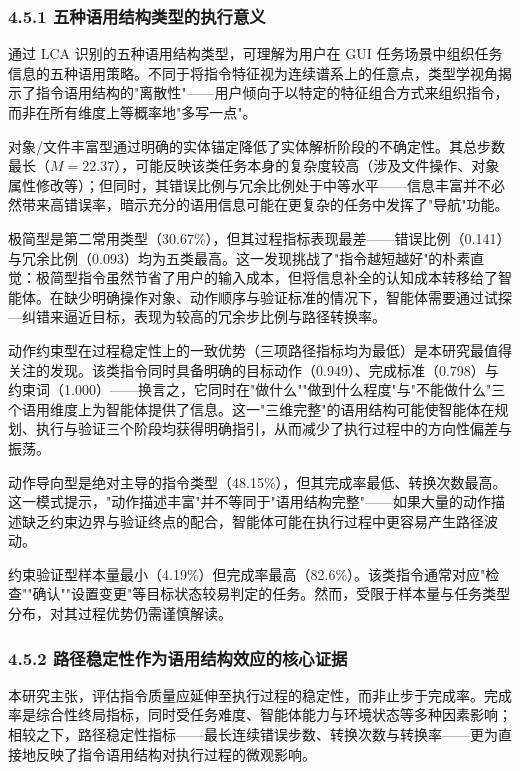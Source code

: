 \documentclass[12pt,a4paper,openany,oneside]{ctexrep}
\begin{document}
\subsubsection{4.5.1 五种语用结构类型的执行意义}


通过 LCA 识别的五种语用结构类型，可理解为用户在 GUI 任务场景中组织任务信息的五种语用策略。不同于将指令特征视为连续谱系上的任意点，类型学视角揭示了指令语用结构的"离散性"——用户倾向于以特定的特征组合方式来组织指令，而非在所有维度上等概率地"多写一点"。

对象/文件丰富型通过明确的实体锚定降低了实体解析阶段的不确定性。其总步数最长（$M=22.37$），可能反映该类任务本身的复杂度较高（涉及文件操作、对象属性修改等）；但同时，其错误比例与冗余比例处于中等水平——信息丰富并不必然带来高错误率，暗示充分的语用信息可能在更复杂的任务中发挥了"导航"功能。

极简型是第二常用类型（30.67\%），但其过程指标表现最差——错误比例（0.141）与冗余比例（0.093）均为五类最高。这一发现挑战了"指令越短越好"的朴素直觉：极简型指令虽然节省了用户的输入成本，但将信息补全的认知成本转移给了智能体。在缺少明确操作对象、动作顺序与验证标准的情况下，智能体需要通过试探—纠错来逼近目标，表现为较高的冗余步比例与路径转换率。

动作约束型在过程稳定性上的一致优势（三项路径指标均为最低）是本研究最值得关注的发现。该类指令同时具备明确的目标动作（0.949）、完成标准（0.798）与约束词（1.000）——换言之，它同时在"做什么""做到什么程度"与"不能做什么"三个语用维度上为智能体提供了信息。这一"三维完整"的语用结构可能使智能体在规划、执行与验证三个阶段均获得明确指引，从而减少了执行过程中的方向性偏差与振荡。

动作导向型是绝对主导的指令类型（48.15\%），但其完成率最低、转换次数最高。这一模式提示，"动作描述丰富"并不等同于"语用结构完整"——如果大量的动作描述缺乏约束边界与验证终点的配合，智能体可能在执行过程中更容易产生路径波动。

约束验证型样本量最小（4.19\%）但完成率最高（82.6\%）。该类指令通常对应"检查""确认""设置变更"等目标状态较易判定的任务。然而，受限于样本量与任务类型分布，对其过程优势仍需谨慎解读。

\subsubsection{4.5.2 路径稳定性作为语用结构效应的核心证据}


本研究主张，评估指令质量应延伸至执行过程的稳定性，而非止步于完成率。完成率是综合性终局指标，同时受任务难度、智能体能力与环境状态等多种因素影响；相较之下，路径稳定性指标——最长连续错误步数、转换次数与转换率——更为直接地反映了指令语用结构对执行过程的微观影响。
\end{document}
